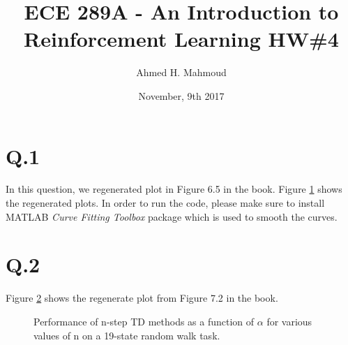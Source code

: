 \documentclass[12pt] {article}
\begin{document}
\title{ECE 289A - An Introduction to Reinforcement Learning HW\#4}

\author{Ahmed H. Mahmoud}
\date{November, 9th 2017} 
\maketitle
\section*{Q.1}
In this question, we regenerated plot in Figure 6.5 in the book. Figure \ref{fig:a} shows the regenerated plots. In order to run the code, please make sure to install MATLAB \emph{Curve Fitting Toolbox} package which is used to smooth the curves. 

\begin{figure}[!tbh]
\centering        
   \caption{}
   \label{fig:a}
\end{figure}

\section*{Q.2}
Figure \ref{fig:b} shows the regenerate plot from Figure 7.2 in the book. 

\begin{figure}[!tbh]
\centering        
   \caption{Performance of n-step TD methods as a function of $\alpha$ for various values of n on a 19-state random walk task.}
   \label{fig:b}
\end{figure}
\end{document}
